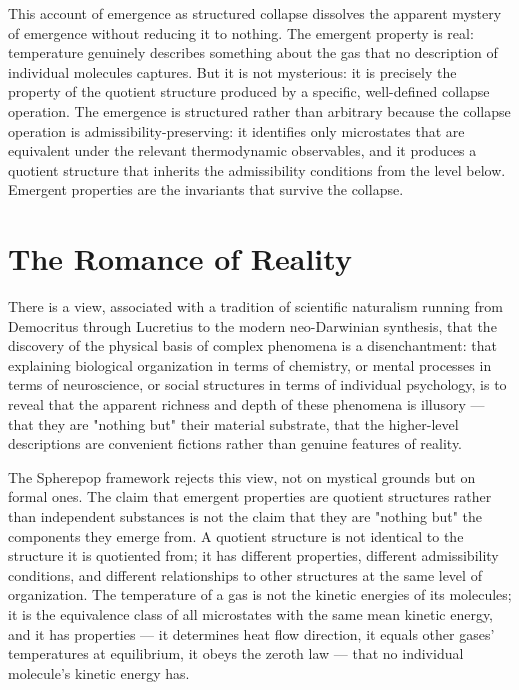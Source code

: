 \documentclass[12pt,openany]{book}
\theoremstyle{plain}
\theoremstyle{definition}
\theoremstyle{remark}
\begin{document}
This account of emergence as structured collapse dissolves the apparent mystery of emergence without reducing it to nothing. The emergent property is real: temperature genuinely describes something about the gas that no description of individual molecules captures. But it is not mysterious: it is precisely the property of the quotient structure produced by a specific, well-defined collapse operation. The emergence is structured rather than arbitrary because the collapse operation is admissibility-preserving: it identifies only microstates that are equivalent under the relevant thermodynamic observables, and it produces a quotient structure that inherits the admissibility conditions from the level below. Emergent properties are the invariants that survive the collapse.

\section{The Romance of Reality}

There is a view, associated with a tradition of scientific naturalism running from Democritus through Lucretius to the modern neo-Darwinian synthesis, that the discovery of the physical basis of complex phenomena is a disenchantment: that explaining biological organization in terms of chemistry, or mental processes in terms of neuroscience, or social structures in terms of individual psychology, is to reveal that the apparent richness and depth of these phenomena is illusory — that they are "nothing but" their material substrate, that the higher-level descriptions are convenient fictions rather than genuine features of reality.

The Spherepop framework rejects this view, not on mystical grounds but on formal ones. The claim that emergent properties are quotient structures rather than independent substances is not the claim that they are "nothing but" the components they emerge from. A quotient structure is not identical to the structure it is quotiented from; it has different properties, different admissibility conditions, and different relationships to other structures at the same level of organization. The temperature of a gas is not the kinetic energies of its molecules; it is the equivalence class of all microstates with the same mean kinetic energy, and it has properties — it determines heat flow direction, it equals other gases' temperatures at equilibrium, it obeys the zeroth law — that no individual molecule's kinetic energy has.
\end{document}
